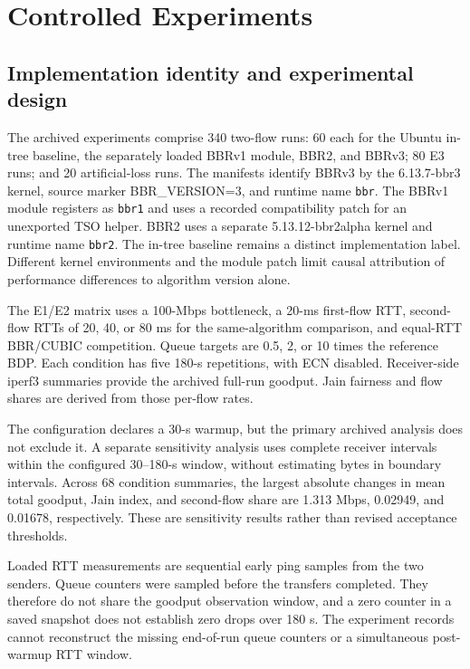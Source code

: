 \section{Controlled Experiments}
\label{sec:controlled_experiments}

\subsection{Implementation identity and experimental design}
The archived experiments comprise 340 two-flow runs: 60 each for the
Ubuntu in-tree baseline, the separately loaded BBRv1 module, BBR2, and
BBRv3; 80 E3 runs; and 20 artificial-loss runs. The manifests identify
BBRv3 by the 6.13.7-bbr3 kernel, source marker BBR\_VERSION=3, and runtime
name \texttt{bbr}. The BBRv1 module registers as \texttt{bbr1} and uses
a recorded compatibility patch for an unexported TSO helper. BBR2 uses
a separate 5.13.12-bbr2alpha kernel and runtime name \texttt{bbr2}.
The in-tree baseline remains a distinct implementation label.
Different kernel environments and the module patch limit causal
attribution of performance differences to algorithm version alone.

The E1/E2 matrix uses a 100-Mbps bottleneck, a 20-ms first-flow RTT,
second-flow RTTs of 20, 40, or 80 ms for the same-algorithm comparison,
and equal-RTT BBR/CUBIC competition. Queue targets are 0.5, 2, or 10
times the reference BDP. Each condition has five 180-s repetitions,
with ECN disabled. Receiver-side iperf3 summaries provide the archived
full-run goodput. Jain fairness and flow shares are derived from those
per-flow rates.

The configuration declares a 30-s warmup, but the primary archived
analysis does not exclude it. A separate sensitivity analysis uses
complete receiver intervals within the configured 30--180-s window,
without estimating bytes in boundary intervals. Across 68 condition
summaries, the largest absolute changes in mean total goodput, Jain
index, and second-flow share are 1.313 Mbps, 0.02949, and 0.01678,
respectively. These are sensitivity results rather than revised
acceptance thresholds.

Loaded RTT measurements are sequential early ping samples from the two
senders. Queue counters were sampled before the transfers completed.
They therefore do not share the goodput observation window, and a zero
counter in a saved snapshot does not establish zero drops over 180 s.
The experiment records cannot reconstruct the missing end-of-run
queue counters or a simultaneous post-warmup RTT window.

